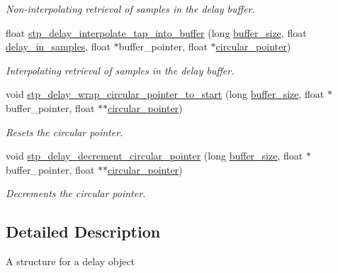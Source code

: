 \begin{DoxyCompactItemize}
\begin{DoxyCompactList}\small\item\em Non-\/interpolating retrieval of samples in the delay buffer. ~\newline
 \end{DoxyCompactList}\item 
float \hyperlink{structstp__delay_ae1939d094a58d97c948543a0fc87e89a}{stp\+\_\+delay\+\_\+interpolate\+\_\+tap\+\_\+into\+\_\+buffer} (long \hyperlink{structstp__delay_ac0b5d1ec75d16c57ad6376f09c9693ca}{buffer\+\_\+size}, float \hyperlink{structstp__delay_a1e57a43103f17324d4e3f4132fc8d195}{delay\+\_\+in\+\_\+samples}, float $\ast$buffer\+\_\+pointer, float $\ast$\hyperlink{structstp__delay_a8ae11daccf5b56bb5a49c9a99956d23a}{circular\+\_\+pointer})
\begin{DoxyCompactList}\small\item\em Interpolating retrieval of samples in the delay buffer. ~\newline
 \end{DoxyCompactList}\item 
void \hyperlink{structstp__delay_a3e4604fbffa850674871f575f9f93967}{stp\+\_\+delay\+\_\+wrap\+\_\+circular\+\_\+pointer\+\_\+to\+\_\+start} (long \hyperlink{structstp__delay_ac0b5d1ec75d16c57ad6376f09c9693ca}{buffer\+\_\+size}, float $\ast$buffer\+\_\+pointer, float $\ast$$\ast$\hyperlink{structstp__delay_a8ae11daccf5b56bb5a49c9a99956d23a}{circular\+\_\+pointer})
\begin{DoxyCompactList}\small\item\em Resets the circular pointer. ~\newline
 \end{DoxyCompactList}\item 
void \hyperlink{structstp__delay_a113435fd3ee00f76077d1029bcf3ea58}{stp\+\_\+delay\+\_\+decrement\+\_\+circular\+\_\+pointer} (long \hyperlink{structstp__delay_ac0b5d1ec75d16c57ad6376f09c9693ca}{buffer\+\_\+size}, float $\ast$buffer\+\_\+pointer, float $\ast$$\ast$\hyperlink{structstp__delay_a8ae11daccf5b56bb5a49c9a99956d23a}{circular\+\_\+pointer})
\begin{DoxyCompactList}\small\item\em Decrements the circular pointer. ~\newline
 \end{DoxyCompactList}\end{DoxyCompactItemize}


\subsection{Detailed Description}
A structure for a delay object ~\newline
 

